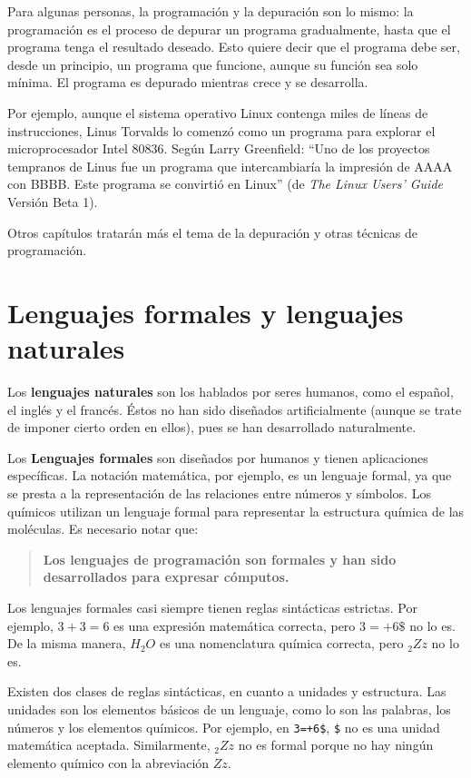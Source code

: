 Para algunas personas, la programación y la depuración son lo
mismo: la programación es el proceso de depurar un programa
gradualmente, hasta que el programa tenga el resultado deseado.
Esto quiere decir que el programa debe ser, desde un principio, un
programa que funcione, aunque su función sea solo mínima. El
programa es depurado mientras crece y se desarrolla.

Por ejemplo, aunque el sistema operativo Linux contenga miles de
líneas de instrucciones, Linus Torvalds lo comenzó como un
programa para explorar el microprocesador Intel 80836. Según Larry
Greenfield: ``Uno de los proyectos tempranos de Linus fue un
programa que intercambiaría la impresión de AAAA con BBBB. Este
programa se convirtió en Linux'' (de {\em The Linux Users' Guide}
Versión Beta 1).


Otros capítulos tratarán más  el tema de la depuración y otras técnicas
de programación.

\section{Lenguajes formales y lenguajes naturales}

Los {\bf lenguajes naturales} son los hablados por seres
humanos, como el español, el inglés y el francés. Éstos no han sido
diseñados artificialmente (aunque se trate de imponer cierto orden en
ellos), pues se han desarrollado naturalmente.

Los {\bf Lenguajes formales}  son diseñados por
humanos y tienen aplicaciones específicas. La notación
matemática, por ejemplo, es un lenguaje formal, ya que se presta a
la representación de las relaciones entre números y símbolos. Los
químicos utilizan un lenguaje formal para representar la
estructura química de las moléculas. Es necesario notar que:

\begin{quote}
{\bf Los lenguajes de programación son formales y han sido
desarrollados para expresar cómputos.}
\end{quote}

Los lenguajes formales casi siempre tienen reglas sintácticas 
estrictas.
Por ejemplo, $3+3=6$ es una expresión matemática correcta, pero
$3=+6\$$ no lo es. De la misma manera, $H_2O$ es una nomenclatura
química correcta, pero $_2Zz$ no lo es.

Existen dos clases de reglas sintácticas, en cuanto a unidades y
estructura. Las unidades son los elementos básicos de un lenguaje,
como lo son las palabras, los números y los elementos químicos.
Por ejemplo, en \texttt{3=+6\$}, \texttt{\$} no es una unidad matemática
aceptada. Similarmente, $_2Zz$ no es formal porque no hay ningún
elemento químico con la abreviación $Zz$.

